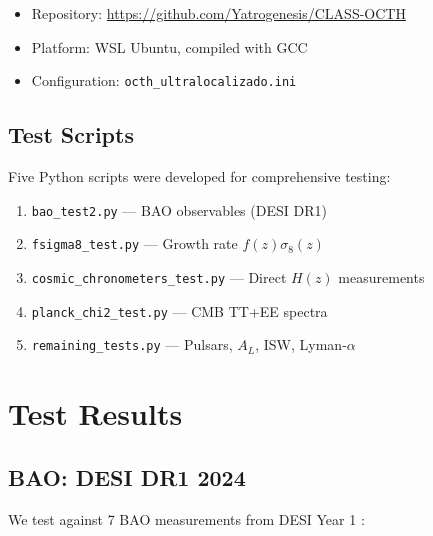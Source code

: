 \documentclass[12pt,a4paper]{article}
\begin{document}
\begin{itemize}
    \item Repository: \url{https://github.com/Yatrogenesis/CLASS-OCTH}
    \item Platform: WSL Ubuntu, compiled with GCC
    \item Configuration: \texttt{octh\_ultralocalizado.ini}
\end{itemize}

\subsection{Test Scripts}

Five Python scripts were developed for comprehensive testing:
\begin{enumerate}
    \item \texttt{bao\_test2.py} --- BAO observables (DESI DR1)
    \item \texttt{fsigma8\_test.py} --- Growth rate $f(z)\sigma_8(z)$
    \item \texttt{cosmic\_chronometers\_test.py} --- Direct $H(z)$ measurements
    \item \texttt{planck\_chi2\_test.py} --- CMB TT+EE spectra
    \item \texttt{remaining\_tests.py} --- Pulsars, $A_L$, ISW, Lyman-$\alpha$
\end{enumerate}

\section{Test Results}

\subsection{BAO: DESI DR1 2024}

We test against 7 BAO measurements from DESI Year 1 \citep{DESI2024}:
\end{document}
